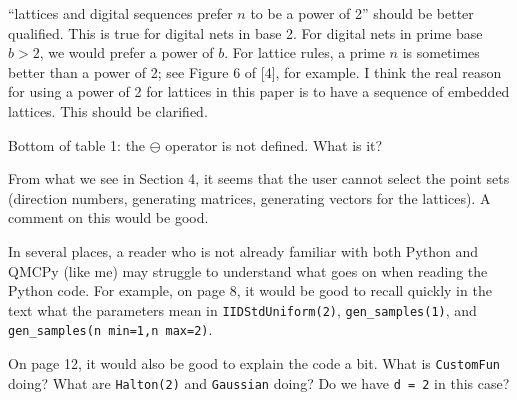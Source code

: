 \documentclass{amsart}
\begin{document}

\vspace{1cm}

``lattices and digital sequences prefer $n$ to be a power of 2'' should be better qualified. This is true for digital nets in base 2. For digital nets in prime base $b > 2$, we would prefer a power of $b$. For lattice rules, a prime $n$ is sometimes better than a power of 2; see Figure 6 of [4], for example. I think the real reason for using a power of 2 for lattices in this paper is to have a sequence of embedded lattices. This should be clarified.


\vspace{1cm}

Bottom of table 1: the 	$\ominus$ operator is not defined. What is it?


\vspace{1cm}

From what we see in Section 4, it seems that the user cannot select the point sets (direction numbers, generating matrices, generating vectors for the lattices). A comment on this would be good. 

\vspace{1cm}

In several places, a reader who is not already familiar with both Python and QMCPy (like me) may struggle to understand what goes on when reading the Python code. For example, on page 8, it would be good to recall quickly in the text what the parameters mean in \texttt{IIDStdUniform(2)}, \texttt{gen\_samples(1)}, and \texttt{gen\_samples(n min=1,n max=2)}.

\vspace{1cm}

On page 12, it would also be good to explain the code a bit. What is \texttt{CustomFun} doing? What are \texttt{Halton(2)} and \texttt{Gaussian} doing? Do we have \texttt{d = 2} in this case?
\end{document}
